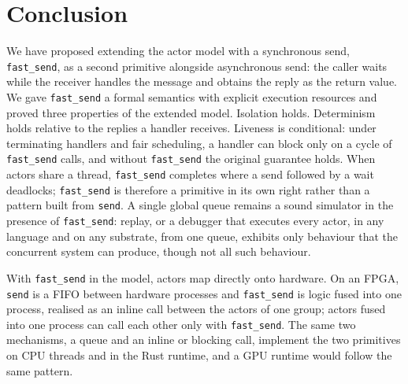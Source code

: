 \documentclass[11pt]{article}
\theoremstyle{definition}
\theoremstyle{remark}
\newcommand{\fs}{\texttt{fast\_send}}
\newcommand{\snd}{\texttt{send}}
\begin{document}
\section{Conclusion}

We have proposed extending the actor model with a synchronous send, \fs{}, as a second
primitive alongside asynchronous send: the caller waits while the receiver handles the
message and obtains the reply as the return value. We gave \fs{} a formal semantics with
explicit execution resources and proved three properties of the extended model.
Isolation holds. Determinism holds relative to the replies a handler receives. Liveness
is conditional: under terminating handlers and fair scheduling, a handler can block only
on a cycle of \fs{} calls, and without \fs{} the original guarantee holds. When actors
share a thread, \fs{} completes where a send followed by a wait deadlocks; \fs{} is
therefore a primitive in its own right rather than a pattern built from \snd{}. A single
global queue remains a sound simulator in the presence of \fs{}: replay, or a debugger
that executes every actor, in any language and on any substrate, from one queue, exhibits
only behaviour that the concurrent system can produce, though not all such behaviour.

With \fs{} in the model, actors map directly onto hardware. On an FPGA, \snd{} is a FIFO
between hardware processes and \fs{} is logic fused into one process, realised as an
inline call between the actors of one group; actors fused into one process can call each
other only with \fs{}. The same two mechanisms, a queue and an inline or blocking call,
implement the two primitives on CPU threads and in the Rust runtime, and a GPU runtime
would follow the same pattern.
\end{document}
